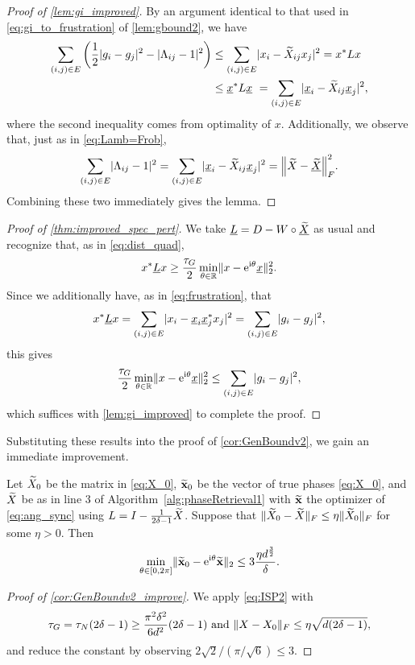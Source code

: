 \begin{proof}[Proof of \cref{lem:gi_improved}]
  By an argument identical to that used in \eqref{eq:gi_to_frustration} of \cref{lem:gbound2}, we have \begin{align*}\sum_{(i, j) \in E}  \left(\frac{1}{2} |g_i - g_j|^2 - |\Lambda_{ij} - 1|^2\right) &\le \sum_{(i, j) \in E}  \lvert x_i - \widetilde{X}_{ij} x_j\rvert^2 = x^* L x \\ &\le \underline{x}^* L \underline{x} \ = \sum_{(i, j) \in E}  \lvert\underline{x}_i - \widetilde{X}_{ij} \underline{x}_j\rvert^2,\end{align*} where the second inequality comes from optimality of $x$.  Additionally, we observe that, just as in \eqref{eq:Lamb=Frob}, \[\sumedge \abs{\Lambda_{ij} - 1}^2 = \sumedge  \abs{\ux_i - \tX_{ij} \ux_j}^2 = \norm*{\tX - \utX}_F^2.\]  Combining these two immediately gives the lemma.
\end{proof}

\begin{proof}[Proof of \cref{thm:improved_spec_pert}]
  We take $\underline{L} = D - W \circ \underline{\widetilde{X}}$ as usual and recognize that, as in \eqref{eq:dist_quad}, \[x^* \underline{L} x \ge \frac{\tau_G}{2} \min_{\theta \in \mathbb{R}} \lVert x - \mathrm{e}^{\mathrm{i}\theta} \underline{x}\rVert_2^2.\]  Since we additionally have, as in \eqref{eq:frustration}, that \[x^* \underline{L} x = \sum_{(i, j) \in E} \lvert x_i - \underline{x}_i \underline{x}_j^* x_j\rvert^2 = \sum_{(i, j) \in E}\lvert g_i - g_j\rvert^2,\] this gives \[\frac{\tau_G}{2} \min_{\theta \in \mathbb{R}} \lVert x - \mathrm{e}^{\mathrm{i}\theta} \underline{x}\rVert_2^2 \le \sum_{(i, j) \in E}\lvert g_i - g_j\rvert^2,\] which suffices with \cref{lem:gi_improved} to complete the proof.
\end{proof}

Substituting these results into the proof of \cref{cor:GenBoundv2}, we gain an immediate improvement.

\begin{corollary} \label{cor:GenBoundv2_improve}
  Let $\widetilde{X}_0$ be the matrix in \eqref{eq:X_0}, $\widetilde{\mathbf{x}}_0$ be the vector of true phases \eqref{eq:X_0}, and $\widetilde{X}$ be as in line 3 of Algorithm~\ref{alg:phaseRetrieval1} with $\widetilde{\mathbf{x}}$ the optimizer of \eqref{eq:ang_sync} using $L = I - \frac{1}{2 \delta - 1} \widetilde{X}$.  Suppose that $\lVert\widetilde{X}_0 - \widetilde{X}\rVert_F \le \eta \lVert\widetilde{X}_0\rVert_F$ for some $\eta > 0$.  Then
  \[\min_{\theta\in[0,2\pi]} \lVert\widetilde{\mathbf{x}}_0 - \mathrm{e}^{\mathrm{i} \theta} \widetilde{\mathbf{x}}\rVert_2 \le 3 \dfrac{\eta d^{\frac{3}{2}}}{\delta}.\]
\end{corollary}

\begin{proof}[Proof of \cref{cor:GenBoundv2_improve}]
  We apply \eqref{eq:ISP2} with \[\tau_G = \tau_N(2 \delta - 1) \ge \frac{\pi^2 \delta^2}{6 d^2}(2 \delta - 1) \ \text{and} \ \norm{X - X_0}_F \le \eta \sqrt{d (2 \delta - 1)},%
  \] and reduce the constant by observing $2 \sqrt{2} / (\pi / \sqrt{6}) \le 3$.
\end{proof}

